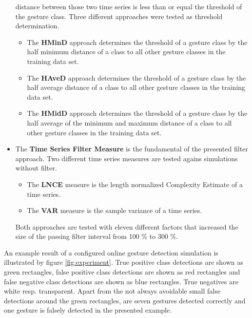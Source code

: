 \begin{itemize}
        distance between those two time series is less than or equal the threshold of the gesture class. Three different
        approaches were tested as threshold determination.
        \begin{itemize}
            \item The \textbf{HMinD} approach determines the threshold of a gesture class by the half minimum distance
                of a class to all other gesture classes in the training data set.
            \item The \textbf{HAveD} approach determines the threshold of a gesture class by the half average distance
                of a class to all other gesture classes in the training data set.
            \item The \textbf{HMidD} approach determines the threshold of a gesture class by the half average of the
                minimum and maximum distance of a class to all other gesture classes in the training data set.
        \end{itemize}
    \item The \textbf{Time Series Filter Measure} is the fundamental of the presented filter approach. Two different
        time series measures are tested agains simulations without filter.
        \begin{itemize}
            \item The \textbf{LNCE} measure is the length normalized Complexity Estimate of a time series.
            \item The \textbf{VAR} measure is the sample variance of a time series.
        \end{itemize}
        Both approaches are tested with eleven different factors that increased the size of the passing filter interval
        from 100 \% to 300 \%.
\end{itemize}

An example result of a configured online gesture detection simulation is illustrated by figure \ref{fig:experiment}.
True positive class detections are shown as green rectangles, false positive class detections are shown as red
rectangles and false negative class detections are shown as blue rectangles. True negatives are white resp.
transparent. Apart from the not always avoidable small
false detections around the green rectangles, are seven gestures detected correctly and one gesture is falsely detected
in the presented example.


